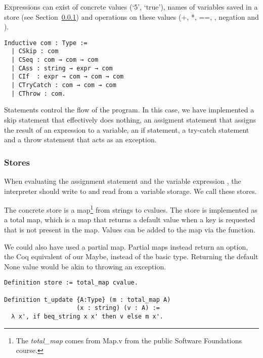 Expressions can exist of concrete values (`5', `true'), names of variables
saved in a store (see Section~\ref{sec:stores}) and operations on these values
(+, *, ==, \coq{<= }, negation and \coq{&& }). 

\begin{listing}
\begin{verbatim}
Inductive com : Type :=
  | CSkip : com
  | CSeq : com → com → com
  | CAss : string → expr → com
  | CIf  : expr → com → com → com
  | CTryCatch : com → com → com
  | CThrow : com. 
\end{verbatim}
\end{listing}

Statements control the flow of the program. In this case, we have implemented a
skip statement that effectively does nothing, an assigment statement that
assigns the result of an expression to a variable, an if statement, a try-catch
statement and a throw statement that acts as an exception.

\subsubsection{Stores}\label{sec:stores}
When evaluating the assignment statement  and the variable
expression , the interpreter should write to and read from a variable
storage. We call these stores. 

The concrete store is a map\footnote{The \textit{total\_map} comes from 
	Map.v from the public Software Foundations course.\cite{softwarefoundations}} 
from strings to cvalues. The store is implemented as a total map, which is a
map that returns a default value when a key is requested that is not present in
the map. Values can be added to the map via the 
function.

We could also have used a partial map. Partial maps instead return an option,
the Coq equivalent of our Maybe, instead of the basic type.
Returning the default None value would be akin to throwing an exception.

\begin{listing}
\begin{verbatim}
Definition store := total_map cvalue.

Definition t_update {A:Type} (m : total_map A)
                    (x : string) (v : A) :=
  λ x', if beq_string x x' then v else m x'.

\end{verbatim}
\end{listing}

